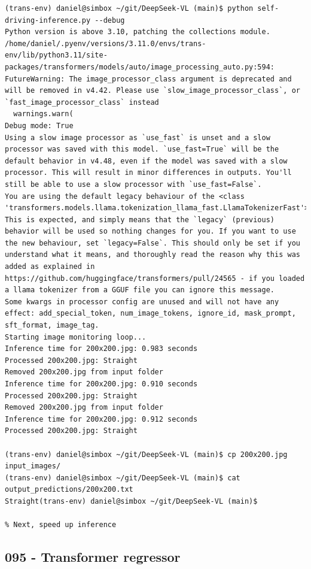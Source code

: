 \begin{verbatim}
(trans-env) daniel@simbox ~/git/DeepSeek-VL (main)$ python self-driving-inference.py --debug
Python version is above 3.10, patching the collections module.
/home/daniel/.pyenv/versions/3.11.0/envs/trans-env/lib/python3.11/site-packages/transformers/models/auto/image_processing_auto.py:594: FutureWarning: The image_processor_class argument is deprecated and will be removed in v4.42. Please use `slow_image_processor_class`, or `fast_image_processor_class` instead
  warnings.warn(
Debug mode: True
Using a slow image processor as `use_fast` is unset and a slow processor was saved with this model. `use_fast=True` will be the default behavior in v4.48, even if the model was saved with a slow processor. This will result in minor differences in outputs. You'll still be able to use a slow processor with `use_fast=False`.
You are using the default legacy behaviour of the <class 'transformers.models.llama.tokenization_llama_fast.LlamaTokenizerFast'>. This is expected, and simply means that the `legacy` (previous) behavior will be used so nothing changes for you. If you want to use the new behaviour, set `legacy=False`. This should only be set if you understand what it means, and thoroughly read the reason why this was added as explained in https://github.com/huggingface/transformers/pull/24565 - if you loaded a llama tokenizer from a GGUF file you can ignore this message.
Some kwargs in processor config are unused and will not have any effect: add_special_token, num_image_tokens, ignore_id, mask_prompt, sft_format, image_tag. 
Starting image monitoring loop...
Inference time for 200x200.jpg: 0.983 seconds
Processed 200x200.jpg: Straight
Removed 200x200.jpg from input folder
Inference time for 200x200.jpg: 0.910 seconds
Processed 200x200.jpg: Straight
Removed 200x200.jpg from input folder
Inference time for 200x200.jpg: 0.912 seconds
Processed 200x200.jpg: Straight

(trans-env) daniel@simbox ~/git/DeepSeek-VL (main)$ cp 200x200.jpg input_images/
(trans-env) daniel@simbox ~/git/DeepSeek-VL (main)$ cat output_predictions/200x200.txt 
Straight(trans-env) daniel@simbox ~/git/DeepSeek-VL (main)$ 

% Next, speed up inference 
\end{verbatim}{}

\subsection{095 - Transformer regressor}
\label{app_res:095}


